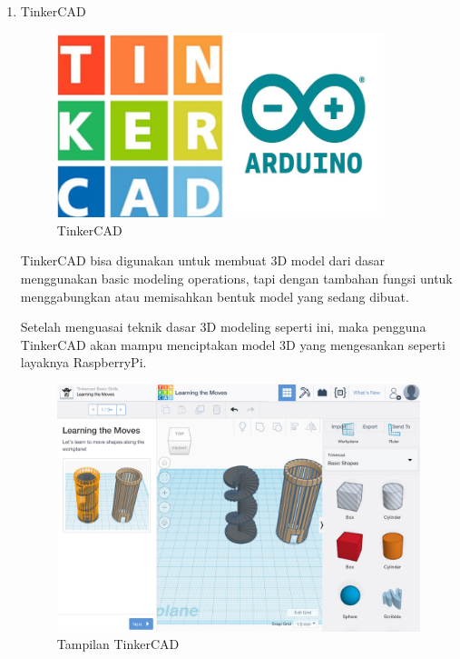 \begin{enumerate}
\item TinkerCAD
\begin{figure}[H]
\centering
\includegraphics[width=0.9\textwidth]{figures/tinker.png}
\caption{TinkerCAD}
\label{print}
\end{figure}
\par TinkerCAD bisa digunakan untuk membuat 3D model dari dasar menggunakan basic modeling operations, tapi dengan tambahan fungsi untuk menggabungkan atau memisahkan bentuk model yang sedang dibuat.

\par Setelah menguasai teknik dasar 3D modeling seperti ini, maka pengguna TinkerCAD akan mampu menciptakan model 3D yang mengesankan seperti layaknya RaspberryPi. 
\begin{figure}[H]
\centering
\includegraphics[width=1\textwidth]{figures/tinker2.jpeg}
\caption{Tampilan TinkerCAD}
\label{print}
\end{figure}


\end{enumerate}
